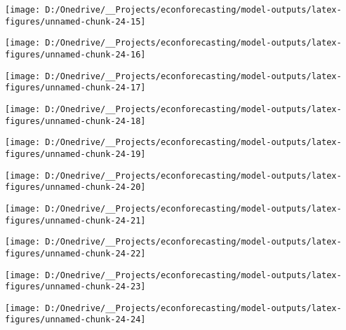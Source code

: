 \documentclass[11pt, letterpaper]{article}\usepackage[]{graphicx}\usepackage[]{color}
\begin{document}
{\centering \texttt{[image: D:/Onedrive/\_\_Projects/econforecasting/model-outputs/latex-figures/unnamed-chunk-24-15]} 

}




{\centering \texttt{[image: D:/Onedrive/\_\_Projects/econforecasting/model-outputs/latex-figures/unnamed-chunk-24-16]} 

}




{\centering \texttt{[image: D:/Onedrive/\_\_Projects/econforecasting/model-outputs/latex-figures/unnamed-chunk-24-17]} 

}




{\centering \texttt{[image: D:/Onedrive/\_\_Projects/econforecasting/model-outputs/latex-figures/unnamed-chunk-24-18]} 

}




{\centering \texttt{[image: D:/Onedrive/\_\_Projects/econforecasting/model-outputs/latex-figures/unnamed-chunk-24-19]} 

}




{\centering \texttt{[image: D:/Onedrive/\_\_Projects/econforecasting/model-outputs/latex-figures/unnamed-chunk-24-20]} 

}




{\centering \texttt{[image: D:/Onedrive/\_\_Projects/econforecasting/model-outputs/latex-figures/unnamed-chunk-24-21]} 

}




{\centering \texttt{[image: D:/Onedrive/\_\_Projects/econforecasting/model-outputs/latex-figures/unnamed-chunk-24-22]} 

}




{\centering \texttt{[image: D:/Onedrive/\_\_Projects/econforecasting/model-outputs/latex-figures/unnamed-chunk-24-23]} 

}




{\centering \texttt{[image: D:/Onedrive/\_\_Projects/econforecasting/model-outputs/latex-figures/unnamed-chunk-24-24]} 

}
\end{document}

